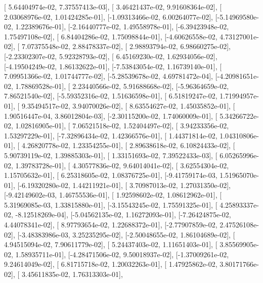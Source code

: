 \documentclass{article}
\begin{document}
       [ 5.64404974e-02,  7.37557413e-03],
       [ 3.46421437e-02,  9.91608364e-02],
       [ 2.03068976e-02,  1.01424285e-01],
       [-1.09313466e-02,  6.00264077e-02],
       [-5.14969580e-02,  1.22389676e-01],
       [-2.16440777e-02,  1.49558978e-01],
       [-6.39423948e-02,  1.75497108e-02],
       [ 6.84404286e-02,  1.75098844e-01],
       [-4.60626558e-02,  4.73127001e-02],
       [ 7.07375548e-02,  2.88478337e-02],
       [ 2.98893794e-02,  6.98660275e-02],
       [-2.23302307e-02,  5.92328793e-02],
       [ 6.45169230e-02,  1.62934056e-02],
       [-4.19504249e-02,  1.86132622e-01],
       [-7.53843054e-02,  1.16739140e-01],
       [ 7.09951366e-02,  1.01744777e-02],
       [-5.28539678e-02,  4.69781472e-04],
       [-4.20981651e-02,  1.78869528e-01],
       [ 2.23440566e-02,  5.91688668e-02],
       [-5.96364659e-02,  7.86521540e-02],
       [-5.59352316e-02,  1.51636598e-01],
       [ 6.51819247e-02,  1.71994957e-01],
       [ 9.35494517e-02,  3.94070026e-02],
       [ 8.63554627e-02,  1.45035852e-01],
       [ 1.90516447e-04,  3.86012804e-03],
       [-2.30115200e-02,  1.74060009e-01],
       [ 5.34266722e-02,  1.02816905e-01],
       [ 7.06521518e-02,  1.52404497e-02],
       [ 3.94233356e-02,  1.53297229e-01],
       [-7.32896434e-02,  1.42366576e-01],
       [ 1.44371814e-02,  1.04310806e-01],
       [ 4.26820778e-02,  1.23354255e-01],
       [ 2.89638618e-02,  6.10824433e-02],
       [ 5.90739119e-02,  1.39885303e-01],
       [ 1.33151693e-02,  7.39522433e-03],
       [ 6.05265996e-02,  1.39783728e-01],
       [ 4.30577836e-02,  9.64014041e-02],
       [ 3.62554304e-02,  1.15705632e-01],
       [ 6.25318605e-02,  1.08376725e-01],
       [-9.41759174e-03,  1.51965070e-01],
       [-6.19320280e-02,  1.44211921e-01],
       [ 3.70987013e-02,  1.27031350e-02],
       [-9.42149602e-03,  1.46755536e-01],
       [ 1.92598602e-02,  1.08612962e-01],
       [ 5.31969085e-03,  1.33815880e-01],
       [-3.15543245e-02,  1.75591325e-01],
       [ 4.25893337e-02, -8.12518269e-04],
       [-5.04562135e-02,  1.16272093e-01],
       [-7.26424875e-02,  4.44078341e-02],
       [ 8.97793654e-02,  1.22688372e-01],
       [-2.77907859e-02,  2.47526108e-02],
       [-3.48383986e-03,  3.25235295e-02],
       [-2.50048655e-02,  1.86104689e-02],
       [ 4.94515094e-02,  7.90611779e-02],
       [ 5.24437403e-02,  1.11651403e-01],
       [ 3.85569905e-02,  1.58935711e-01],
       [-4.28471506e-02,  9.50018937e-02],
       [-1.37009261e-02,  9.24614049e-02],
       [ 6.81715718e-02,  1.20032263e-01],
       [ 1.47925862e-02,  3.80171766e-02],
       [ 3.45611835e-02,  1.76313303e-01],
\end{document}
